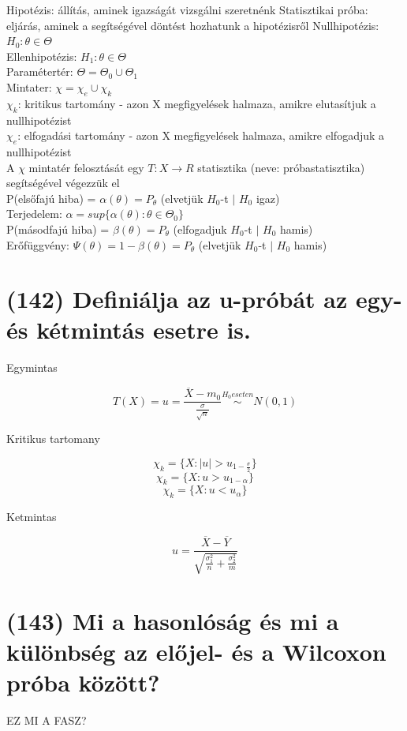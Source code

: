 \documentclass[12p]{article}
\begin{document}
Hipotézis: állítás, aminek igazságát vizsgálni szeretnénk
Statisztikai próba: eljárás, aminek a segítségével döntést hozhatunk a hipotézisről
Nullhipotézis: $H_0 : \theta \in \Theta$\\
Ellenhipotézis: $H_1 : \theta \in \Theta$\\
Paramétertér: $\Theta = \Theta_0 \cup \Theta_1$\\
Mintater: $\chi = \chi_e \cup \chi_k$\\
$\chi_k$: kritikus tartomány - azon X megfigyelések halmaza, amikre elutasítjuk a nullhipotézist\\
$\chi_e$: elfogadási tartomány - azon X megfigyelések halmaza, amikre elfogadjuk a nullhipotézist\\
A $\chi$ mintatér felosztását egy $T : X \rightarrow R$ statisztika (neve: próbastatisztika) segítségével végezzük el\\
P(elsőfajú hiba) = $\alpha(\theta) = P_\theta$ (elvetjük $H_0$-t $|$ $H_0$ igaz)\\
Terjedelem: $\alpha = sup\{\alpha(\theta) : \theta \in \Theta_0\}$\\
P(másodfajú hiba) = $\beta(\theta) = P_\theta$ (elfogadjuk $H_0$-t $|$ $H_0$ hamis)\\
Erőfüggvény: $\Psi(\theta) = 1 - \beta(\theta) = P_\theta$ (elvetjük $H_0$-t $|$ $H_0$ hamis)

\section{(142)  Definiálja az u-próbát az egy- és kétmintás esetre is.}

Egymintas

$$T(X) = u = \frac{\overline{X} - m_0}{\frac{\sigma}{\sqrt{n}}} \stackrel{H_0 eseten}{\sim} N(0, 1)$$

Kritikus tartomany

$$\chi_k = \{X: |u| > u_{1-\frac{\sigma}{2}}\}$$
$$\chi_k = \{X: u > u_{1-\alpha}\}$$
$$\chi_k = \{X: u < u_\alpha\}$$

Ketmintas

$$\displaystyle{u = \frac{\overline{X} - \overline{Y}}{\sqrt{\frac{\sigma_1^2}{n} + \frac{\sigma_2^2}{m}}}}$$

\section{(143) Mi a hasonlóság és mi a különbség az előjel- és a Wilcoxon próba között?}

EZ MI A FASZ?
\end{document}
